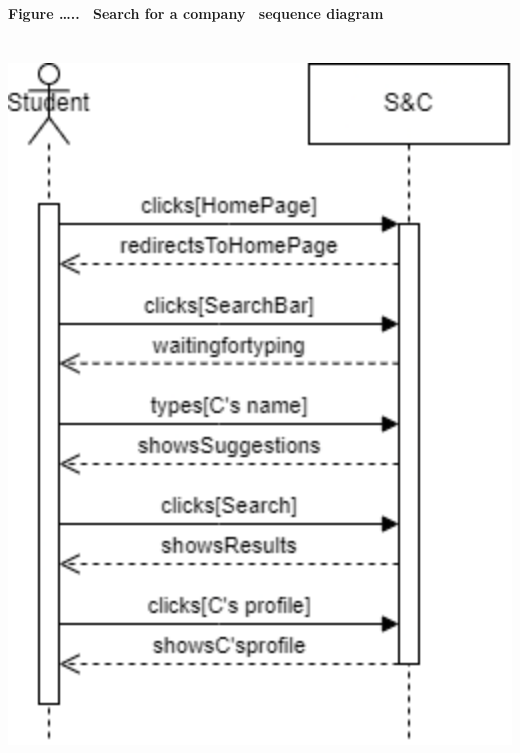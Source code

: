 \textbf{Figure \ldots..~ Search for a company~ sequence diagram}

\includegraphics[width=5.63889in,height=7.625in]{Images/image5.png}


